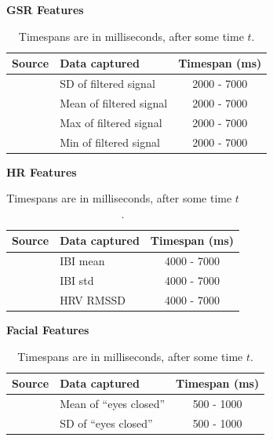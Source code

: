 \begin{table}[H]
    {\large \textbf{GSR Features}}\vspace{2pt}
    \begin{tabularx}{\columnwidth}{cXc}
        \toprule
        \textbf{Source} & \textbf{Data captured} & \textbf{Timespan (ms)}\\
        \midrule
        \cite{gsr_len_lat3, gsr_data_processing} & SD of filtered signal & 2000 - 7000\\
        \cite{gsr_len_lat3, gsr_data_processing} & Mean of filtered signal & 2000 - 7000\\
        \cite{gsr_len_lat3, gsr_data_processing} & Max of filtered signal & 2000 - 7000\\
        \cite{gsr_len_lat3, gsr_data_processing} & Min of filtered signal & 2000 - 7000\\
        \bottomrule
    \end{tabularx}
    \label{[TABLE] features gsr}

    {\large \textbf{HR Features}}\vspace{2pt}
    \begin{tabularx}{\columnwidth}{cXc}
        \toprule
        \textbf{Source}                  & \textbf{Data captured} & \textbf{Timespan (ms)} \\
        \midrule
        \cite{hr_feature1, hrv_source_3} & IBI mean               & 4000 - 7000            \\
        \cite{hr_feature1}               & IBI std                & 4000 - 7000            \\
        \cite{hr_feature1}               & HRV RMSSD              & 4000 - 7000            \\
        \bottomrule
    \end{tabularx}
    \label{[TABLE] features hr}

    {\large \textbf{Facial Features}}\vspace{2pt}
    \begin{tabularx}{\columnwidth}{cXc}
        \toprule
        \textbf{Source} & \textbf{Data captured} & \textbf{Timespan (ms)} \\
        \midrule
        \cite{scherer_kinect} & Mean of ``eyes closed'' & 500 - 1000 \\
        \cite{scherer_kinect} & SD of ``eyes closed''   & 500 - 1000 \\
        \bottomrule
    \end{tabularx}
    \caption{Timespans are in milliseconds, after some time $t$.}
    \label{[TABLE] features face}
\end{table}